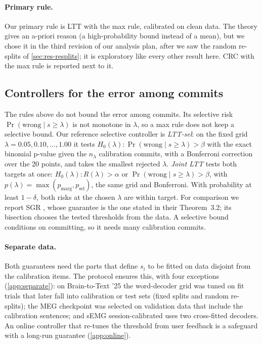\paragraph{Primary rule.} Our primary rule is LTT with the max rule, calibrated on clean data. The theory gives an a-priori reason (a high-probability bound instead of a mean), but we chose it in the third revision of our analysis plan, after we saw the random re-splits of \cref{sec:res-resplits}; it is exploratory like every other result here. CRC with the max rule is reported next to it.

\subsection{Controllers for the error among commits}
\label{sec:selective}
The rules above do not bound the error among commits. Its selective risk $\Pr(\text{wrong} \mid s \ge \lambda)$ is not monotone in $\lambda$, so a max rule does not keep a selective bound. Our reference selective controller is \emph{LTT-sel}: on the fixed grid $\lambda = 0.05, 0.10, \ldots, 1.00$ it tests $H_0(\lambda)\colon \Pr(\text{wrong} \mid s \ge \lambda) > \beta$ with the exact binomial p-value given the $n_\lambda$ calibration commits, with a Bonferroni correction over the 20 points, and takes the smallest rejected $\lambda$. \emph{Joint LTT} tests both targets at once: $H_0(\lambda)\colon R(\lambda) > \alpha$ or $\Pr(\text{wrong} \mid s \ge \lambda) > \beta$, with $p(\lambda) = \max(p_{\mathrm{marg}}, p_{\mathrm{sel}})$, the same grid and Bonferroni. With probability at least $1 - \delta$, both risks at the chosen $\lambda$ are within target. For comparison we report SGR \citep{geifman2017selective}, whose guarantee is the one stated in their Theorem~3.2; its bisection chooses the tested thresholds from the data. A selective bound conditions on committing, so it needs many calibration commits.

\paragraph{Separate data.} Both guarantees need the parts that define $s_i$ to be fitted on data disjoint from the calibration items. The protocol ensures this, with four exceptions (\cref{app:separate}): on Brain-to-Text '25 the word-decoder grid was tuned on fit trials that later fall into calibration or test sets (fixed splits and random re-splits); the MEG checkpoint was selected on validation data that include the calibration sentences; and sEMG session-calibrated uses two cross-fitted decoders. An online controller that re-tunes the threshold from user feedback is a safeguard with a long-run guarantee (\cref{app:online}).
